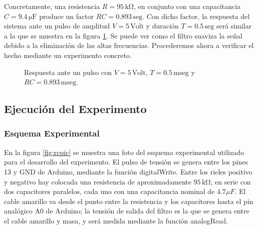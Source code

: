 \documentclass[parskip]{scrartcl}
\begin{document}
Concretamente, una resistencia $R = 95\,\mathrm{k\Omega}$, en conjunto con una capacitancia $C = 9.4\,\mathrm{\mu F}$ produce un factor $RC = 0.893\,\mathrm{seg}$. Con dicho factor, la respuesta del sistema ante un pulso de amplitud $V = 5\,\mathrm{Volt}$ y duración $T = 0.5\,\mathrm{seg}$ será similar a la que se muestra en la figura \ref{fig:rcresponse}. Se puede ver como el filtro suaviza la señal debido a la eliminación de las altas frecuencias. Procederemos ahora a verificar el hecho mediante un experimento concreto.

\begin{figure}[t]
\centering
{}
\caption{Respuesta ante un pulso con $V = 5\,\mathrm{Volt}$, $T = 0.5\,\mathrm{mseg}$ 
         y $RC = 0.893\,\mathrm{mseg}$.}
\label{fig:rcresponse}
\end{figure}

\newpage
\subsection{Ejecución del Experimento}

\subsubsection{Esquema Experimental}

En la figura \ref{fig:rcpic} se muestra una foto del esquema experimental utilizado para el desarrollo del experimento. El pulso de tensión se genera entre los pines 13 y GND de Arduino, mediante la función digitalWrite. Entre los rieles positivo y negativo hay colocada una resistencia de aproximadamente $95\,\mathrm{k\Omega}$, en serie con dos capacitores paralelos, cada uno con una capacitancia nominal de $4.7 \mu F$. El cable amarillo va desde el punto entre la resistencia y los capacitores hasta el pin analógico A0 de Arduino; la tensión de salida del filtro es la que se genera entre el cable amarillo y masa, y será medida mediante la función analogRead.\\
\end{document}
